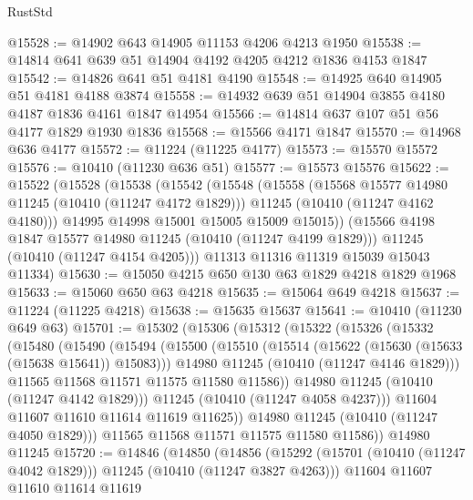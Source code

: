 \begin{lexlean}{RustStd}
\begin{coremodule}
@15528 := @14902 @643 @14905 @11153 @4206 @4213 @1950
@15538 := @14814 @641 @639 @51 @14904 @4192 @4205 @4212 @1836 @4153 @1847
@15542 := @14826 @641 @51 @4181 @4190
@15548 := @14925 @640 @14905 @51 @4181 @4188 @3874
@15558 := @14932 @639 @51 @14904 @3855 @4180 @4187 @1836 @4161 @1847 @14954
@15566 := @14814 @637 @107 @51 @56 @4177 @1829 @1930 @1836
@15568 := @15566 @4171 @1847
@15570 := @14968 @636 @4177
@15572 := @11224 (@11225 @4177)
@15573 := @15570 @15572
@15576 := @10410 (@11230 @636 @51)
@15577 := @15573 @15576
@15622 := @15522
    (@15528
      (@15538
        (@15542
          (@15548
            (@15558
              (@15568 @15577 @14980 @11245 (@10410 (@11247 @4172 @1829)))
              @11245
              (@10410 (@11247 @4162 @4180)))
            @14995
            @14998
            @15001
            @15005
            @15009
            @15015))
        (@15566 @4198 @1847 @15577 @14980 @11245 (@10410 (@11247 @4199 @1829)))
        @11245
        (@10410 (@11247 @4154 @4205)))
      @11313
      @11316
      @11319
      @15039
      @15043
      @11334)
@15630 := @15050 @4215 @650 @130 @63 @1829 @4218 @1829 @1968
@15633 := @15060 @650 @63 @4218
@15635 := @15064 @649 @4218
@15637 := @11224 (@11225 @4218)
@15638 := @15635 @15637
@15641 := @10410 (@11230 @649 @63)
@15701 := @15302
    (@15306
      (@15312
        (@15322
          (@15326
            (@15332
              (@15480
                (@15490
                  (@15494
                    (@15500
                      (@15510
                        (@15514 (@15622 (@15630 (@15633 (@15638 @15641)) @15083)))
                        @14980
                        @11245
                        (@10410 (@11247 @4146 @1829)))
                      @11565
                      @11568
                      @11571
                      @11575
                      @11580
                      @11586))
                  @14980
                  @11245
                  (@10410 (@11247 @4142 @1829)))
                @11245
                (@10410 (@11247 @4058 @4237)))
              @11604
              @11607
              @11610
              @11614
              @11619
              @11625))
          @14980
          @11245
          (@10410 (@11247 @4050 @1829)))
        @11565
        @11568
        @11571
        @11575
        @11580
        @11586))
    @14980
    @11245
@15720 := @14846
    (@14850
      (@14856
        (@15292 (@15701 (@10410 (@11247 @4042 @1829))) @11245 (@10410 (@11247 @3827 @4263)))
        @11604
        @11607
        @11610
        @11614
        @11619

\end{coremodule}
\end{lexlean}
